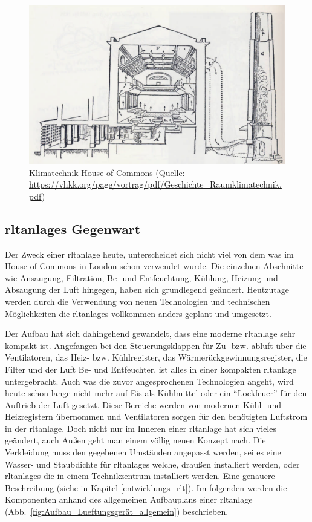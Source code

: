 \begin{figure}[ht]
	\centering
	\includegraphics[width=1\linewidth]{Bilder/Belueftung_House_of_Commons}
	\caption[Klimatechnik House of Commons  (Quelle: \url{https://vhkk.org/page/vortrag/pdf/Geschichte_Raumklimatechnik.pdf}, 
	Zugriff am 09.02.2024)]{Klimatechnik House of Commons  (Quelle: \url{https://vhkk.org/page/vortrag/pdf/Geschichte_Raumklimatechnik.pdf})}
	\label{fig:House_of_Commons_Klimatechnik}
\end{figure}



\subsection{\Acp{rltanlage} Gegenwart}
Der Zweck einer \ac{rltanlage} heute, unterscheidet sich nicht viel von dem was  im House of Commons in London schon verwendet wurde. Die einzelnen Abschnitte wie \zB Ansaugung, Filtration, Be- und Entfeuchtung, Kühlung, Heizung und Absaugung der Luft hingegen, haben sich grundlegend geändert. Heutzutage werden durch die Verwendung von neuen Technologien und technischen Möglichkeiten die \acp{rltanlage} vollkommen anders geplant und umgesetzt.

Der Aufbau hat sich dahingehend gewandelt, dass eine moderne \ac{rltanlage} sehr kompakt ist. Angefangen bei den Steuerungsklappen für Zu- bzw. \gls{abluft} über die Ventilatoren, das Heiz- bzw. Kühlregister, das Wärmerückgewinnungsregister, die Filter und der Luft Be- und Entfeuchter, ist alles in einer kompakten \ac{rltanlage} untergebracht. Auch was die zuvor angesprochenen Technologien angeht, wird heute schon lange nicht mehr auf Eis als Kühlmittel oder ein \enquote{Lockfeuer} für den Auftrieb der Luft gesetzt. Diese Bereiche werden \zB von modernen Kühl- und Heizregistern übernommen und Ventilatoren sorgen für den benötigten Luftstrom in der \ac{rltanlage}. Doch nicht nur im Inneren einer \ac{rltanlage} hat sich vieles geändert, auch Außen geht man einem völlig neuen Konzept nach. Die Verkleidung muss den gegebenen Umständen angepasst werden, sei es eine Wasser- und Staubdichte für \acp{rltanlage} welche, draußen installiert werden, oder \acp{rltanlage} die in einem Technikzentrum installiert werden. Eine genauere Beschreibung (siehe in Kapitel \ref{entwicklungs_rlt}).
Im folgenden werden die Komponenten anhand des allgemeinen Aufbauplans einer \ac{rltanlage} (Abb.~\ref{fig:Aufbau_Lueftungsgerät_allgemein}) beschrieben. 

